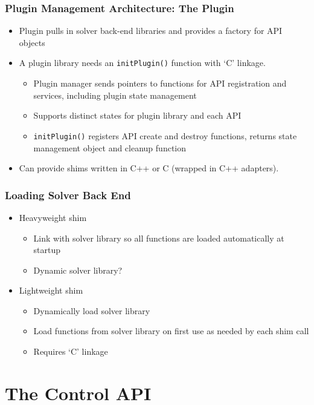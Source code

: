\documentclass{beamer}
\begin{document}
\begin{frame}
  \frametitle{Plugin Management Architecture: The Plugin}

  \begin{itemize}
  \item Plugin pulls in solver back-end libraries and provides a
    factory for API objects
  \item A plugin library needs an \lstinline|initPlugin()| function
    with `C' linkage.
    \begin{itemize}
    \item Plugin manager sends pointers to functions for API
      registration and services, including plugin state management
    \item Supports distinct states for plugin library and each API
    \item \lstinline|initPlugin()| registers API create and destroy
      functions, returns state management object and cleanup
      function
    \end{itemize}
  \item Can provide shims written in C++ or C (wrapped in C++
    adapters).
  \end{itemize}
\end{frame}

\begin{frame}
  \frametitle{Loading Solver Back End}

  \begin{itemize}
  \item Heavyweight shim
    \begin{itemize}
    \item Link with solver library so all functions are loaded
      automatically at startup
    \item Dynamic solver library?
    \end{itemize}
  \item Lightweight shim
    \begin{itemize}
    \item Dynamically load solver library
    \item Load functions from solver library on first use as needed
      by each shim call
    \item Requires `C' linkage
    \end{itemize}
  \end{itemize}
\end{frame}

\section{The Control API}
\end{document}
